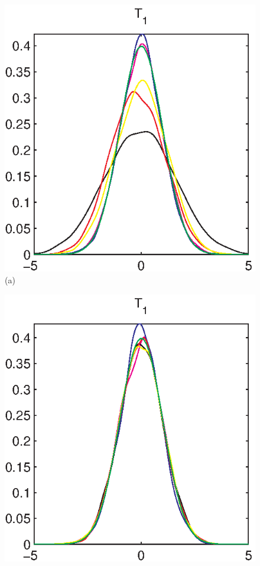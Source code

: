 \documentclass[authoryear,preprint,12pt]{elsarticle}
\begin{document}
\begin{figure}[!htbp]
  \begin{center}
    \begin{minipage}[]{0.45\textwidth}
      \centering
      \includegraphics[width=\textwidth]{mrmcomplex14ny.eps}
      (a)
    \end{minipage}
    \begin{minipage}[]{0.45\textwidth}
      \centering
      \includegraphics[width=\textwidth]{mrmcomplex14nyhighden.eps}

\end{minipage}
\end{center}
\end{figure}
\end{document}
